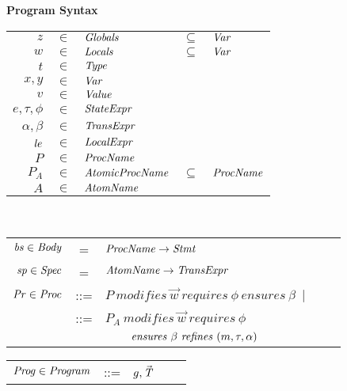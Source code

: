 

\begin{figure}
\setlength{\tabcolsep}{3pt}
{\bf Program Syntax} \\
\begin{tabular}{rclcl}
$z$ & $\in$ & $\mathit{Globals}$ & $\subseteq$ &$\mathit{Var}$ \\
$w$ & $\in$ & $\mathit{Locals}$ & $\subseteq$ & $\mathit{Var}$ \\
$t$ & $\in$ & $\mathit{Type}$ \\
$x,y$ & $\in$ & $\mathit{Var}$ \\
$v$ &  $\in$ & $\mathit{Value}$ \\
$e, \tau, \phi$ & $\in$ & $\mathit{StateExpr}$ \\
$\alpha, \beta$ & $\in$ & $\mathit{TransExpr}$ \\
$\mathit{le}$ & $\in$ & $\mathit{LocalExpr}$ \\
$P$ & $\in$ & $\mathit{ProcName}$ \\
$P_{A}$ & $\in$ & $\mathit{AtomicProcName}$ & $\subseteq$ & $\mathit{ProcName}$ \\
$A$ & $\in$ & $\mathit{AtomName}$ \\
\end{tabular}\\
\begin{tabular}{rclcl}
$\mathit{bs} \in \mathit{Body}$ & = & $\mathit{ProcName} \rightarrow \mathit{Stmt}$ \\
$\mathit{sp} \in \mathit{Spec}$ & = & $\mathit{AtomName} \rightarrow \mathit{TransExpr}$ \\
$\mathit{Pr} \in \mathit{Proc}$&::= & $P\ \mathit{modifies}\ \overrightarrow{w}\ 
                                                        \mathit{requires}\ \phi\
                                                        \mathit{ensures}\ \beta\ \mid $\\
                     & ::= & $P_{A}\ \mathit{modifies}\ \overrightarrow{w}\ 
                     \mathit{requires}\ \phi\ $\\
& &                     $\hspace*{0.8cm} \mathit{ensures}\ \beta\
                     \mathit{refines}\ (m, \tau, \alpha)$\\
\end{tabular}
\begin{tabular}{rclcl}
$\mathit{Prog} \in \mathit{Program}$ & ::= & $g, \vec{\mathit{T}}$ \\

\end{tabular}
\end{figure}
